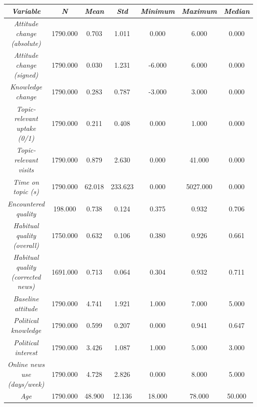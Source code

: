 \begin{tabular}{c c c c c c c}
      \hline
      \textit{Variable} & \textit{N} & \textit{Mean} & \textit{Std} & \textit{Minimum} & \textit{Maximum} & \textit{Median} \\
      \hline
      \textit{Attitude change (absolute)} & 1790.000 & 0.703 & 1.011 & 0.000 & 6.000 & 0.000 \\
      \textit{Attitude change (signed)} & 1790.000 & 0.030 & 1.231 & -6.000 & 6.000 & 0.000 \\
      \textit{Knowledge change} & 1790.000 & 0.283 & 0.787 & -3.000 & 3.000 & 0.000 \\
      \textit{Topic-relevant uptake (0/1)} & 1790.000 & 0.211 & 0.408 & 0.000 & 1.000 & 0.000 \\
      \textit{Topic-relevant visits} & 1790.000 & 0.879 & 2.630 & 0.000 & 41.000 & 0.000 \\
      \textit{Time on topic (s)} & 1790.000 & 62.018 & 233.623 & 0.000 & 5027.000 & 0.000 \\
      \textit{Encountered quality} & 198.000 & 0.738 & 0.124 & 0.375 & 0.932 & 0.706 \\
      \textit{Habitual quality (overall)} & 1750.000 & 0.632 & 0.106 & 0.380 & 0.926 & 0.661 \\
      \textit{Habitual quality (corrected news)} & 1691.000 & 0.713 & 0.064 & 0.304 & 0.932 & 0.711 \\
      \textit{Baseline attitude} & 1790.000 & 4.741 & 1.921 & 1.000 & 7.000 & 5.000 \\
      \textit{Political knowledge} & 1790.000 & 0.599 & 0.207 & 0.000 & 0.941 & 0.647 \\
      \textit{Political interest} & 1790.000 & 3.426 & 1.087 & 1.000 & 5.000 & 3.000 \\
      \textit{Online news use (days/week)} & 1790.000 & 4.728 & 2.826 & 0.000 & 8.000 & 5.000 \\
      \textit{Age} & 1790.000 & 48.900 & 12.136 & 18.000 & 78.000 & 50.000 \\
      \hline
    \end{tabular}
